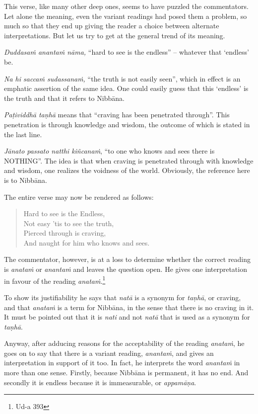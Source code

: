 This verse, like many other deep ones, seems to have puzzled the commentators. Let alone the meaning, even the variant readings had posed them a problem, so much so that they end up giving the reader a choice between alternate interpretations. But let us try to get at the general trend of its meaning.

\emph{Duddasaṁ anantaṁ nāma,} ``hard to see is the endless'' -- whatever that `endless' be.

\emph{Na hi saccaṁ sudassanaṁ,} ``the truth is not easily seen'', which in effect is an emphatic assertion of the same idea. One could easily guess that this `endless' is the truth and that it refers to Nibbāna.

\emph{Paṭividdhā taṇhā} means that ``craving has been penetrated through''. This penetration is through knowledge and wisdom, the outcome of which is stated in the last line.

\emph{Jānato passato natthi kiñcanaṁ}, ``to one who knows and sees there is \mbox{NOTHING}''. The idea is that when craving is penetrated through with knowledge and wisdom, one realizes the voidness of the world. Obviously, the reference here is to Nibbāna.

The entire verse may now be rendered as follows:

\begin{quote}
Hard to see is the Endless,\\
Not easy 'tis to see the truth,\\
Pierced through is craving,\\
And naught for him who knows and sees.
\end{quote}

The commentator, however, is at a loss to determine whether the correct reading is \emph{anataṁ} or \emph{anantaṁ} and leaves the question open. He gives one interpretation in favour of the reading \emph{anataṁ}.\footnote{Ud-a 393}

To show its justifiability he says that \emph{natā} is a synonym for \emph{taṇhā}, or craving, and that \emph{anataṁ} is a term for Nibbāna, in the sense that there is no craving in it. It must be pointed out that it is \emph{nati} and not \emph{natā} that is used as a synonym for \emph{taṇhā}.

Anyway, after adducing reasons for the acceptability of the reading \emph{anataṁ}, he goes on to say that there is a variant reading, \emph{anantaṁ}, and gives an interpretation in support of it too. In fact, he interprets the word \emph{anantaṁ} in more than one sense. Firstly, because Nibbāna is permanent, it has no end. And secondly it is endless because it is immeasurable, or \emph{appamāṇa}.

